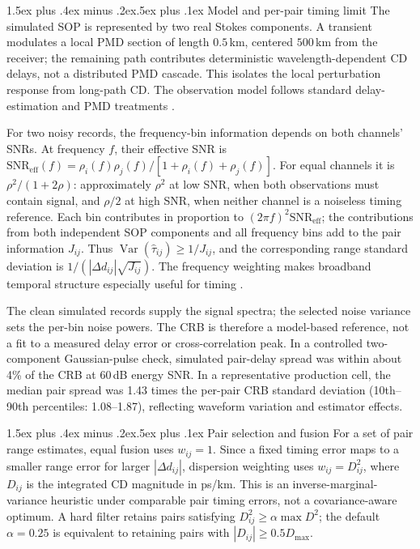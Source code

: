 \documentclass[10pt]{article}
\makeatletter
\renewcommand\section{\@startsection{section}{1}{\z@}%
  {1.5ex plus .4ex minus .2ex}{.5ex plus .1ex}%
  {\normalfont\large\bfseries}}
\newcommand{\SNReff}{\mathrm{SNR}_{\mathrm{eff}}}
\makeatother
\begin{document}
\section{Model and per-pair timing limit}
The simulated SOP is represented by two real Stokes components. A transient modulates a local PMD section of length $0.5$\,km, centered $500$\,km from the receiver; the remaining path contributes deterministic wavelength-dependent CD delays, not a distributed PMD cascade. This isolates the local perturbation response from long-path CD. The observation model follows standard delay-estimation and PMD treatments \cite{weiss1983,sadler2006survey,gisin1992}.

For two noisy records, the frequency-bin information depends on both channels' SNRs. At frequency $f$, their effective SNR is $\SNReff(f)=\rho_i(f)\rho_j(f)/[1+\rho_i(f)+\rho_j(f)]$. For equal channels it is $\rho^2/(1+2\rho)$: approximately $\rho^2$ at low SNR, when both observations must contain signal, and $\rho/2$ at high SNR, when neither channel is a noiseless timing reference. Each bin contributes in proportion to $(2\pi f)^2\SNReff$; the contributions from both independent SOP components and all frequency bins add to the pair information $J_{ij}$. Thus $\operatorname{Var}(\hat\tau_{ij})\ge 1/J_{ij}$, and the corresponding range standard deviation is $1/(|\Delta d_{ij}|\sqrt{J_{ij}})$. The frequency weighting makes broadband temporal structure especially useful for timing \cite{weiss1983,sadler2006survey}.

The clean simulated records supply the signal spectra; the selected noise variance sets the per-bin noise powers. The CRB is therefore a model-based reference, not a fit to a measured delay error or cross-correlation peak. In a controlled two-component Gaussian-pulse check, simulated pair-delay spread was within about 4\% of the CRB at 60\,dB energy SNR. In a representative production cell, the median pair spread was 1.43 times the per-pair CRB standard deviation (10th--90th percentiles: 1.08--1.87), reflecting waveform variation and estimator effects.

\section{Pair selection and fusion}
For a set of pair range estimates, equal fusion uses $w_{ij}=1$. Since a fixed timing error maps to a smaller range error for larger $|\Delta d_{ij}|$, dispersion weighting uses $w_{ij}=D_{ij}^2$, where $D_{ij}$ is the integrated CD magnitude in ps/km. This is an inverse-marginal-variance heuristic under comparable pair timing errors, not a covariance-aware optimum. A hard filter retains pairs satisfying $D_{ij}^2\ge\alpha\max D^2$; the default $\alpha=0.25$ is equivalent to retaining pairs with $|D_{ij}|\ge0.5D_{\max}$.
\end{document}

